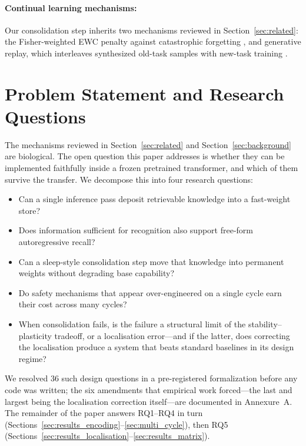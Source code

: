 \paragraph{Continual learning mechanisms:}
Our consolidation step inherits two mechanisms reviewed in Section~\ref{sec:related}: the Fisher-weighted EWC penalty against catastrophic forgetting \citep{kirkpatrick2017overcoming}, and generative replay, which interleaves synthesized old-task samples with new-task training \citep{shin2017continual,rebuffi2017icarl}.

\section{Problem Statement and Research Questions}
\label{sec:problem}

The mechanisms reviewed in Section~\ref{sec:related} and Section~\ref{sec:background} are biological. The open question this paper addresses is whether they can be implemented faithfully inside a frozen pretrained transformer, and which of them survive the transfer. We decompose this into four research questions:

\begin{itemize}[leftmargin=2.4em,itemsep=0.15em,topsep=0.2em]
    \item[(RQ1)] Can a single inference pass deposit retrievable knowledge into a fast-weight store?
    \item[(RQ2)] Does information sufficient for recognition also support free-form autoregressive recall?
    \item[(RQ3)] Can a sleep-style consolidation step move that knowledge into permanent weights without degrading base capability?
    \item[(RQ4)] Do safety mechanisms that appear over-engineered on a single cycle earn their cost across many cycles?
    \item[(RQ5)] When consolidation fails, is the failure a structural limit of the stability--plasticity tradeoff, or a localisation error---and if the latter, does correcting the localisation produce a system that beats standard baselines in its design regime?
\end{itemize}

We resolved 36 such design questions in a pre-registered formalization before any code was written; the six amendments that empirical work forced---the last and largest being the localisation correction itself---are documented in Annexure~A. The remainder of the paper answers RQ1--RQ4 in turn (Sections~\ref{sec:results_encoding}--\ref{sec:multi_cycle}), then RQ5 (Sections~\ref{sec:results_localisation}--\ref{sec:results_matrix}).


